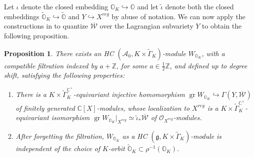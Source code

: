 \documentclass[11pt, a4paper]{amsart}
\newcommand{\C}{\mathbb{C}}
\newcommand{\g}{\mathfrak{g}}
\newcommand{\orb}{\mathbb{O}}
\newcommand{\orbk}{\orb_{K}}
\newcommand{\torbk}{\widetilde{\orb}_{K}}
\newcommand{\Z}{\mathbb{Z}}
\newcommand{\gr}{\operatorname{gr}}
\newcommand{\cA}{\mathcal{A}}
\newcommand{\cW}{\mathcal{W}}
\newcommand{\tGamma}{\widetilde{\Gamma}}
\newcommand{\cm}{\C^\times}
\newcommand{\OO}{\mathcal{O}}
\newtheorem{Prop}[Thm]{Proposition}
\theoremstyle{definition}
\numberwithin{equation}{section}
\begin{document}
Let $\iota$ denote the closed embedding $\orbk \hookrightarrow \orb$ and let $\tilde{\iota}$ denote both the closed embeddings $\torbk \hookrightarrow \widetilde{\orb}$ and $Y \hookrightarrow X^{reg}$ by abuse of notation. We can now apply the constructions in \cite{LY} to quantize $\overline{\cW}$ over the Lagrangian subvariety $Y$ to obtain the following proposition. 
 
\begin{Prop} \label{prop:quant_cW}
	There exists an HC $(\cA_0, K \times \tGamma_K)$-module $W_{\orbk}$, with a compatible filtration indexed by $a + \Z$, for some $a \in \frac{1}{2}\Z$, and defined up to degree shift, satisfying the following properties:
    \begin{enumerate}
        \item There is a $K \times \tGamma_K^{\cm}$-equivariant injective homomorphism $\gr W_{\orbk} \hookrightarrow \Gamma(Y,\overline{\cW})$ of finitely generated $\C[X]$-modules, whose localization to $X^{reg}$ is a $K \times \tGamma_K^{\cm}$-equivariant isomorphism $\gr W_{\orbk}|_{X^{reg}} \simeq \tilde{\iota}_* \overline{\cW}$ of $\OO_{X^{reg}}$-modules.
        \item After forgetting the filtration, $W_{\orbk}$ as a HC $(\g, K \times \tGamma_K)$-module is independent of the choice of $K$-orbit $\torbk \subset \rho^{-1}(\orbk)$.
    \end{enumerate}  
\end{Prop}
\end{document}
